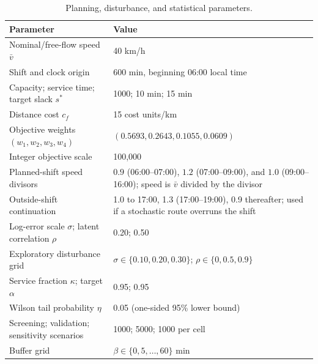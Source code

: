 \documentclass[11pt,a4paper]{article}
\begin{document}
\begin{table}[ht]
\centering
\small
\caption{Planning, disturbance, and statistical parameters.}
\label{tab:parameters}
\begin{tabular}{p{}p{}}
\toprule
Parameter & Value \\
\midrule
Nominal/free-flow speed $\bar v$ & 40 km/h \\
Shift and clock origin & 600 min, beginning 06:00 local time \\
Capacity; service time; target slack $s^*$ & 1000; 10 min; 15 min \\
Distance cost $c_f$ & 15 cost units/km \\
Objective weights $(w_1,w_2,w_3,w_4)$ & $(0.5693,0.2643,0.1055,0.0609)$ \\
Integer objective scale & 100,000 \\
Planned-shift speed divisors &
$0.9$ (06:00--07:00), $1.2$ (07:00--09:00), and $1.0$
(09:00--16:00); speed is $\bar v$ divided by the divisor \\
Outside-shift continuation & 1.0 to 17:00, 1.3 (17:00--19:00), 0.9 thereafter;
used if a stochastic route overruns the shift \\
Log-error scale $\sigma$; latent correlation $\rho$ & 0.20; 0.50 \\
Exploratory disturbance grid & $\sigma\in\{0.10,0.20,0.30\}$;
$\rho\in\{0,0.5,0.9\}$ \\
Service fraction $\kappa$; target $\alpha$ & 0.95; 0.95 \\
Wilson tail probability $\eta$ & 0.05 (one-sided 95\% lower bound) \\
Screening; validation; sensitivity scenarios & 1000; 5000; 1000 per cell \\
Buffer grid & $\beta\in\{0,5,\ldots,60\}$ min \\
\bottomrule
\end{tabular}
\end{table}
\end{document}
